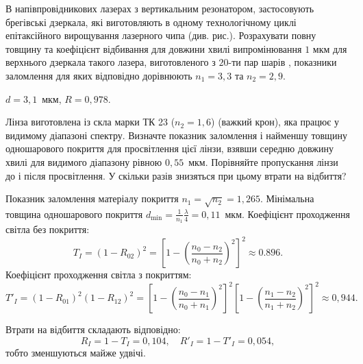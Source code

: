 \begin{problem}%
    В напівпровідникових лазерах з вертикальним резонатором, застосовують брегівські дзеркала, які виготовляють в одному технологічному циклі епітаксійного вирощування лазерного чипа (див. рис.). Розрахувати повну товщину та коефіцієнт відбивання для довжини хвилі випромінювання $ 1 $ мкм для верхнього дзеркала такого лазера, виготовленого з $ 20 $-ти пар шарів , показники заломлення для яких відповідно дорівнюють $ n_1= 3,3 $  та $ n_2=2,9 $.

    \begin{center}
    
%
    \end{center}

\begin{solution}
    $ d =  3,1$~мкм, $ R=0,978 $.
\end{solution}
\end{problem}


\begin{problem}%
    Лінза виготовлена із скла марки ТК 23 ($ n_2 = 1,6 $) (важкий крон), яка працює у видимому діапазоні спектру. Визначте показник заломлення і найменшу товщину одношарового покриття для просвітлення цієї лінзи, взявши середню довжину хвилі для видимого діапазону рівною $ 0,55 $~мкм. Порівняйте пропускання лінзи до і після просвітлення. У скільки разів знизяться при цьому втрати на відбиття?
\begin{solution}
    Показник заломлення матеріалу покриття $ n_1 = \sqrt{n_2} = 1,265  $.
    Мінімальна товщина одношарового покриття $ d_{\min} =  \frac{1}{n_1}\frac\lambda4 = 0,11$~мкм.
    Коефіцієнт проходження світла без покриття:
    \begin{equation*}
        T_I = (1 - R_{02})^2 = \left[ 1 - \left( \frac{n_0 - n_2}{n_0 + n_2}\right)^2 \right]^2 \approx 0.896.
    \end{equation*}
     Коефіцієнт проходження світла з покриттям:
     \begin{equation*}
         T'_I = (1 - R_{01})^2 (1 - R_{12})^2 = \left[ 1 - \left( \frac{n_0 - n_1}{n_0 + n_1}\right)^2 \right]^2 \left[ 1 - \left( \frac{n_1 - n_2}{n_1 + n_2}\right)^2 \right]^2 \approx 0,944.
     \end{equation*}

     Втрати на відбиття складають відповідно:
     \begin{equation*}
         R_I = 1 - T_I = 0,104, \quad R'_I = 1- T'_I = 0,054,
     \end{equation*}
     тобто зменшуються майже удвічі.
\end{solution}
\end{problem}




